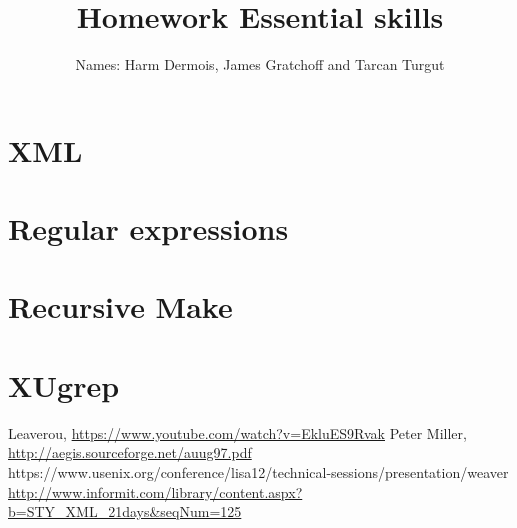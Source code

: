 \documentclass[12pt,a4paper]{article}
\begin{document}
\title{Homework Essential skills}
\author{Names: Harm Dermois, James Gratchoff and Tarcan Turgut }
\date{}
\maketitle

\section{XML}

\section{Regular expressions}

\section{Recursive Make}

\section{XUgrep}


\begin{thebibliography}{9}
	Leaverou,
	\url{https://www.youtube.com/watch?v=EkluES9Rvak}
	Peter Miller,
	\url{http://aegis.sourceforge.net/auug97.pdf}
	https://www.usenix.org/conference/lisa12/technical-sessions/presentation/weaver
	\url{http://www.informit.com/library/content.aspx?b=STY_XML_21days&seqNum=125}
\end{thebibliography}
\end{document}
